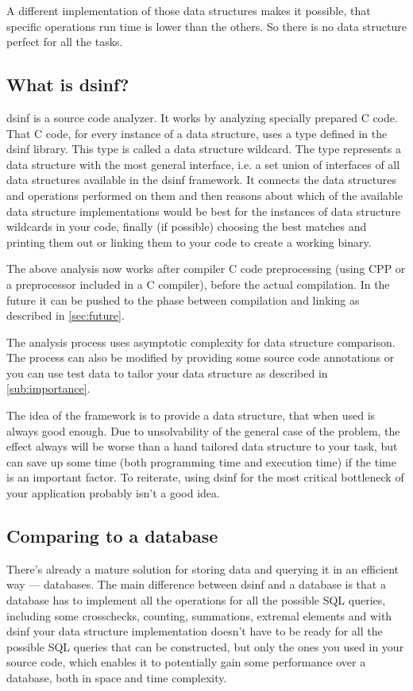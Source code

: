 \documentclass[a4paper,11pt]{article}
\begin{document}
	A different implementation of those data structures makes it possible, that specific operations run time is
	lower than the others. So there is no data structure perfect for all the tasks.

	\subsection{What is dsinf?} \label{sub:intro}

		dsinf is a source code analyzer. It works by analyzing specially prepared C code. That C code, for every
		instance of a data structure, uses a type defined in the dsinf library. This type is called a data
		structure wildcard. The type represents a data structure with the most general interface, i.e. a set union
		of interfaces of all data structures available in the dsinf framework. It connects the data structures
		and operations performed on them and then reasons about which of the available data structure
		implementations would be best for the instances of data structure wildcards in your code, finally (if
		possible) choosing the best matches and printing them out or linking them to your code to create a
		working binary.

		The above analysis now works after compiler C code preprocessing (using CPP or a preprocessor included in a C compiler), before the actual compilation. In the future it can be
		pushed to the phase between compilation and linking as described in \autoref{sec:future}.

		The analysis process uses asymptotic complexity for data structure comparison. The process can also be
		modified by providing some source code annotations or you can use test data to tailor your data
		structure as described in \autoref{sub:importance}.

		The idea of the framework is to provide a data structure, that when used is always good enough. Due to
		unsolvability of the general case of the problem, the effect always will be worse than a hand tailored
		data structure to your task, but can save up some time (both programming time and execution time) if the
        time is an important factor. To reiterate, using dsinf for the most critical bottleneck of your
		application probably isn't a good idea.

	\subsection{Comparing to a database} \label{sub:database}
        There's already a mature solution for storing data and querying it in an efficient way --- databases.
		The main difference between dsinf and a database is that a database has to implement all the operations
		for all the possible SQL queries, including some crosschecks, counting, summations, extremal elements
		and with dsinf your data structure implementation doesn't have to be ready for all the possible SQL
		queries that can be constructed, but only the ones you used in your source code, which enables it to
		potentially gain some performance over a database, both in space and time complexity.
\end{document}
